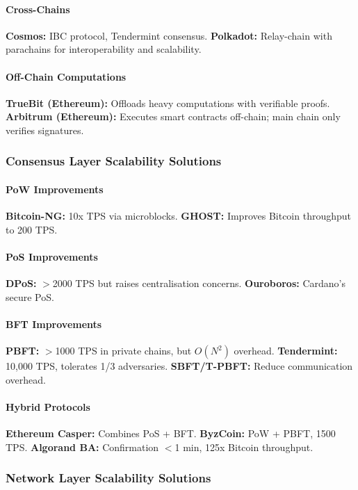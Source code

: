\paragraph{Cross-Chains}
\textbf{Cosmos:} IBC protocol, Tendermint consensus.  
\textbf{Polkadot:} Relay-chain with parachains for interoperability and scalability.

\paragraph{Off-Chain Computations}
\textbf{TrueBit (Ethereum):} Offloads heavy computations with verifiable proofs.  
\textbf{Arbitrum (Ethereum):} Executes smart contracts off-chain; main chain only verifies signatures.

\subsubsection{Consensus Layer Scalability Solutions}
\paragraph{PoW Improvements}
\textbf{Bitcoin-NG:} 10x TPS via microblocks.  
\textbf{GHOST:} Improves Bitcoin throughput to 200 TPS.

\paragraph{PoS Improvements}
\textbf{DPoS:} $>$2000 TPS but raises centralisation concerns.  
\textbf{Ouroboros:} Cardano’s secure PoS.

\paragraph{BFT Improvements}
\textbf{PBFT:} $>$1000 TPS in private chains, but $O(N^2)$ overhead.  
\textbf{Tendermint:} 10,000 TPS, tolerates 1/3 adversaries.  
\textbf{SBFT/T-PBFT:} Reduce communication overhead.

\paragraph{Hybrid Protocols}
\textbf{Ethereum Casper:} Combines PoS + BFT.  
\textbf{ByzCoin:} PoW + PBFT, 1500 TPS.  
\textbf{Algorand BA:} Confirmation $<$1 min, 125x Bitcoin throughput.

\subsubsection{Network Layer Scalability Solutions}
